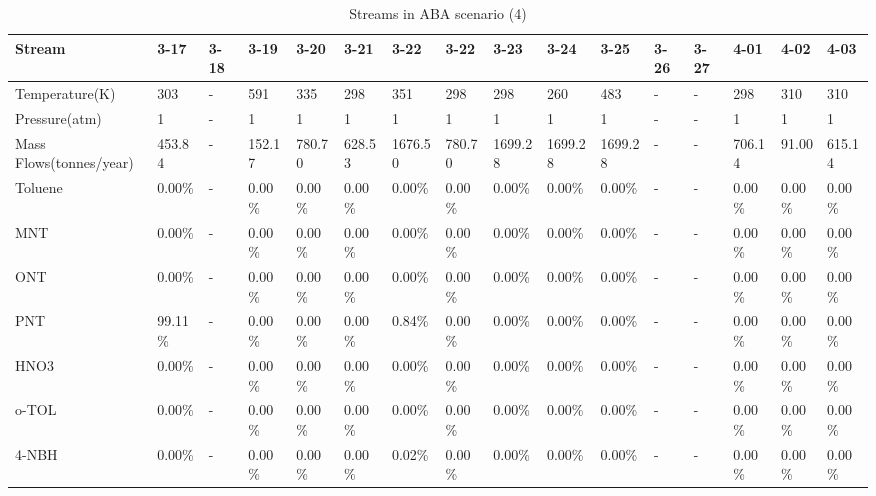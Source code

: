 \begin{landscape}
\begin{table}[H]
\centering
\caption{Streams in ABA scenario (4)}
\label{ABAFST4}
\begin{tabular}{|l|l|l|l|l|l|l|l|l|l|l|l|l|l|l|l|}
\hline
\textbf{Stream}         & 3-17    & 3-18 & 3-19     & 3-20    & 3-21    & 3-22    & 3-22    & 3-23    & 3-24    & 3-25    & 3-26 & 3-27 & 4-01    & 4-02     & 4-03    \\ \hline
Temperature(K)          & 303     & -    & 591      & 335     & 298     & 351     & 298     & 298     & 260     & 483     & -    & -    & 298     & 310      & 310     \\ \hline
Pressure(atm)           & 1       & -    & 1        & 1       & 1       & 1       & 1       & 1       & 1       & 1       & -    & -    & 1       & 1        & 1       \\ \hline
Mass Flows(tonnes/year) & 453.84  & -    & 152.17   & 780.70  & 628.53  & 1676.50 & 780.70  & 1699.28 & 1699.28 & 1699.28 & -    & -    & 706.14  & 91.00    & 615.14  \\ \hline
Toluene                 & 0.00\%  & -    & 0.00\%   & 0.00\%  & 0.00\%  & 0.00\%  & 0.00\%  & 0.00\%  & 0.00\%  & 0.00\%  & -    & -    & 0.00\%  & 0.00\%   & 0.00\%  \\ \hline
MNT                     & 0.00\%  & -    & 0.00\%   & 0.00\%  & 0.00\%  & 0.00\%  & 0.00\%  & 0.00\%  & 0.00\%  & 0.00\%  & -    & -    & 0.00\%  & 0.00\%   & 0.00\%  \\ \hline
ONT                     & 0.00\%  & -    & 0.00\%   & 0.00\%  & 0.00\%  & 0.00\%  & 0.00\%  & 0.00\%  & 0.00\%  & 0.00\%  & -    & -    & 0.00\%  & 0.00\%   & 0.00\%  \\ \hline
PNT                     & 99.11\% & -    & 0.00\%   & 0.00\%  & 0.00\%  & 0.84\%  & 0.00\%  & 0.00\%  & 0.00\%  & 0.00\%  & -    & -    & 0.00\%  & 0.00\%   & 0.00\%  \\ \hline
HNO3                    & 0.00\%  & -    & 0.00\%   & 0.00\%  & 0.00\%  & 0.00\%  & 0.00\%  & 0.00\%  & 0.00\%  & 0.00\%  & -    & -    & 0.00\%  & 0.00\%   & 0.00\%  \\ \hline
o-TOL                   & 0.00\%  & -    & 0.00\%   & 0.00\%  & 0.00\%  & 0.00\%  & 0.00\%  & 0.00\%  & 0.00\%  & 0.00\%  & -    & -    & 0.00\%  & 0.00\%   & 0.00\%  \\ \hline
4-NBH                   & 0.00\%  & -    & 0.00\%   & 0.00\%  & 0.00\%  & 0.02\%  & 0.00\%  & 0.00\%  & 0.00\%  & 0.00\%  & -    & -    & 0.00\%  & 0.00\%   & 0.00\%  \\ \hline

\end{tabular}
\end{table}
\end{landscape}
